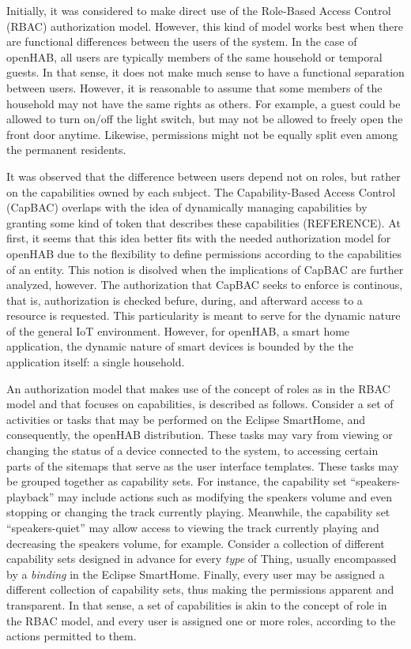 \documentclass[12pt]{article}
\begin{document}
Initially, it was considered to make direct use of the Role-Based Access Control (RBAC) authorization model. However, this kind of model works best when there are functional differences between the users of the system. In the case of openHAB, all users are typically members of the same household or temporal guests. In that sense, it does not make much sense to have a functional separation between users. However, it is reasonable to assume that some members of the household may not have the same rights as others. For example, a guest could be allowed to turn on/off the light switch, but may not be allowed to freely open the front door anytime. Likewise, permissions might not be equally split even among the permanent residents.

It was observed that the difference between users depend not on roles, but rather on the capabilities owned by each subject. The Capability-Based Access Control (CapBAC) overlaps with the idea of dynamically managing capabilities by granting some kind of token that describes these capabilities (REFERENCE). At first, it seems that this idea better fits with the needed authorization model for openHAB due to the flexibility to define permissions according to the capabilities of an entity. This notion is disolved when the implications of CapBAC are further analyzed, however. The authorization that CapBAC seeks to enforce is continous, that is, authorization is checked befure, during, and afterward access to a resource is requested. This particularity is meant to serve for the dynamic nature of the general IoT environment. However, for openHAB, a smart home application, the dynamic nature of smart devices is bounded by the the application itself: a single household.

An authorization model that makes use of the concept of roles as in the RBAC model and that focuses on capabilities, is described as follows. Consider a set of activities or tasks that may be performed on the Eclipse SmartHome, and consequently, the openHAB distribution. These tasks may vary from viewing or changing the status of a device connected to the system, to accessing certain parts of the sitemaps that serve as the user interface templates. These tasks may be grouped together as capability sets. For instance, the capability set ``speakers-playback'' may include actions such as modifying the speakers volume and even stopping or changing the track currently playing. Meanwhile, the capability set ``speakers-quiet'' may allow access to viewing the track currently playing and decreasing the speakers volume, for example. Consider a collection of different capability sets designed in advance for every \emph{type} of Thing, usually encompassed by a \emph{binding} in the Eclipse SmartHome. Finally, every user may be assigned a different collection of capability sets, thus making the permissions apparent and transparent. In that sense, a set of capabilities is akin to the concept of role in the RBAC model, and every user is assigned one or more roles, according to the actions permitted to them.
\end{document}
